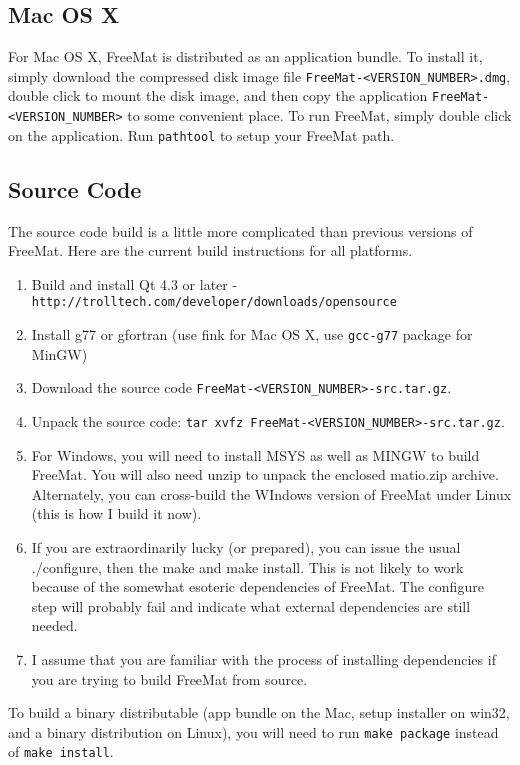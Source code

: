 \subsection{Mac OS X}

For Mac OS X, FreeMat is distributed as an application bundle.  To install it,
simply download the compressed disk image file \verb|FreeMat-<VERSION_NUMBER>.dmg|, double
click to mount the disk image, and then copy the application \verb|FreeMat-<VERSION_NUMBER>| to
some convenient place.  To run FreeMat, simply double click on the application.  Run
\verb|pathtool| to setup your FreeMat path.
\subsection{Source Code}

The source code build is a little more complicated than previous versions of FreeMat.  Here
are the current build instructions for all platforms.
\begin{enumerate}
\item  Build and install Qt 4.3 or later - \verb|http://trolltech.com/developer/downloads/opensource|

\item  Install g77 or gfortran (use fink for Mac OS X, use \verb|gcc-g77| package for MinGW)

\item  Download the source code \verb|FreeMat-<VERSION_NUMBER>-src.tar.gz|.

\item  Unpack the source code: \verb|tar xvfz FreeMat-<VERSION_NUMBER>-src.tar.gz|.

\item  For Windows, you will need to install MSYS as well as MINGW to
build FreeMat.  You will also need unzip to unpack the enclosed
matio.zip archive.  Alternately, you can cross-build the WIndows version
of FreeMat under Linux (this is how I build it now).

\item  If you are extraordinarily lucky (or prepared), you can issue the
usual ./configure, then the make and make install.
This is not likely to work
because of the somewhat esoteric dependencies of FreeMat.  The configure
step will probably fail and indicate what external dependencies are
still needed. 

\item  I assume that you are familiar with the process of installing 
dependencies if you are trying to build FreeMat from source.

\end{enumerate}
To build a binary distributable (app bundle on the Mac, setup
installer on win32, and a binary distribution on Linux), you will
need to run \verb|make package| instead of \verb|make install|.
